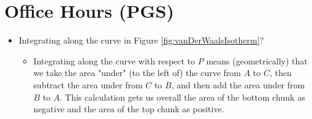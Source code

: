 \documentclass[../notes.tex]{subfiles}
\begin{document}
\section{Office Hours (PGS)}
\begin{itemize}
    \item Integrating along the curve in Figure \ref{fig:vanDerWaalsIsotherm}?
    \begin{itemize}
        \item Integrating along the curve with respect to $P$ means (geometrically) that we take the area "under" (to the left of) the curve from $A$ to $C$, then subtract the area under from $C$ to $B$, and then add the area under from $B$ to $A$. This calculation gets us overall the area of the bottom chunk as negative and the area of the top chunk as positive.
    \end{itemize}
\end{itemize}
\end{document}

